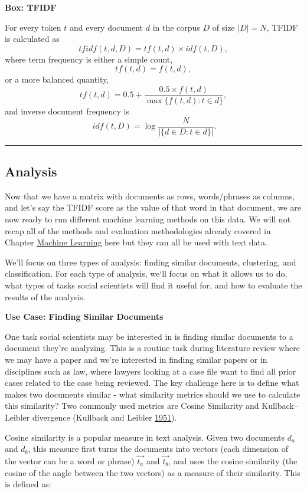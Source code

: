 \documentclass[]{krantz}
\begin{document}
\textbf{Box: TFIDF}

For every token \(t\) and every document \(d\) in the corpus \(D\) of
size \(\mid D\mid = N\), TFIDF is calculated as
\[tfidf(t,d,D) = tf(t,d) \times
idf(t,D),\] where term frequency is either a simple count,
\[tf(t,d)=f(t,d),\] or a more balanced quantity,
\[tf(t,d) = 0.5+\frac{0.5 \times
  f(t,d)}{\max\{f(t,d):t\in d\}},\] and inverse document frequency is
\[\
idf(t,D) = \log\frac{N}{|\{d\in D:t\in d\}|}.\]

\begin{center}\rule{0.5\linewidth}{\linethickness}\end{center}

\subsection{Analysis}\label{analysis}

Now that we have a matrix with documents as rows, words/phrases as
columns, and let's say the TFIDF score as the value of that word in that
document, we are now ready to run different machine learning methods on
this data. We will not recap all of the methods and evaluation
methodologies already covered in Chapter
\protect\hyperlink{chap:ml}{Machine Learning} here but they can all be
used with text data.

We'll focus on three types of analysis: finding similar documents,
clustering, and classification. For each type of analysis, we`ll focus
on what it allows us to do, what types of tasks social scientists will
find it useful for, and how to evaluate the results of the analysis.

\textbf{Use Case: Finding Similar Documents}

One task social scientists may be interested in is finding similar
documents to a document they're analyzing. This is a routine task during
literature review where we may have a paper and we're interested in
finding similar papers or in disciplines such as law, where lawyers
looking at a case file want to find all prior cases related to the case
being reviewed. The key challenge here is to define what makes two
documents similar - what similarity metrics should we use to calculate
this similarity? Two commonly used metrics are Cosine Similarity and
Kullback--Leibler divergence (Kullback and Leibler
\protect\hyperlink{ref-kullback1951information}{1951}).

Cosine similarity is a popular measure in text analysis. Given two
documents \(d_a\) and \(d_b\), this measure first turns the documents
into vectors (each dimension of the vector can be a word or phrase)
\(\overrightarrow{t_a}\) and \(\overrightarrow{t_b}\), and uses the
cosine similarity (the cosine of the angle between the two vectors) as a
measure of their similarity. This is defined as:
\end{document}
